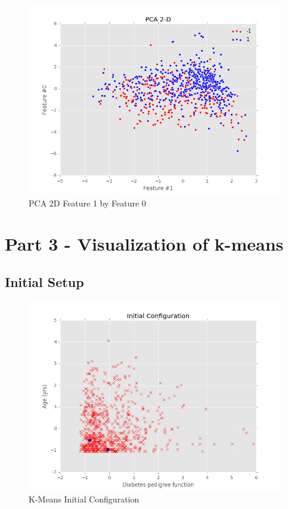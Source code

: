 \documentclass[12pt]{article}
\begin{document}
\begin{figure}[H]
\begin{center}
\includegraphics[scale=0.64]{PCA-graph2.png}
\caption{PCA 2D Feature 1 by Feature 0}
\end{center}
\end{figure}

\newpage


\section*{Part 3 - Visualization of k-means}
\subsection*{Initial Setup}
\begin{figure}[H]
\begin{center}
\includegraphics[scale=0.85]{InitialConfiguration.png}
\caption{K-Means Initial Configuration}
\end{center}
\end{figure}
\end{document}
